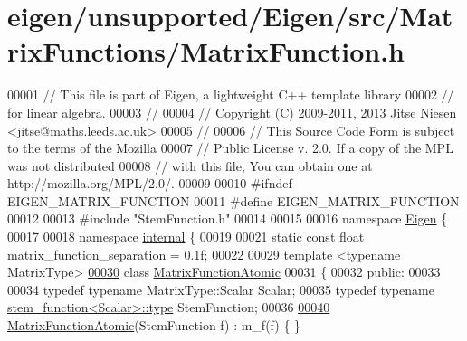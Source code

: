 \hypertarget{eigen_2unsupported_2_eigen_2src_2_matrix_functions_2_matrix_function_8h_source}{}\section{eigen/unsupported/\+Eigen/src/\+Matrix\+Functions/\+Matrix\+Function.h}
\label{eigen_2unsupported_2_eigen_2src_2_matrix_functions_2_matrix_function_8h_source}

\begin{DoxyCode}
00001 \textcolor{comment}{// This file is part of Eigen, a lightweight C++ template library}
00002 \textcolor{comment}{// for linear algebra.}
00003 \textcolor{comment}{//}
00004 \textcolor{comment}{// Copyright (C) 2009-2011, 2013 Jitse Niesen <jitse@maths.leeds.ac.uk>}
00005 \textcolor{comment}{//}
00006 \textcolor{comment}{// This Source Code Form is subject to the terms of the Mozilla}
00007 \textcolor{comment}{// Public License v. 2.0. If a copy of the MPL was not distributed}
00008 \textcolor{comment}{// with this file, You can obtain one at http://mozilla.org/MPL/2.0/.}
00009 
00010 \textcolor{preprocessor}{#ifndef EIGEN\_MATRIX\_FUNCTION}
00011 \textcolor{preprocessor}{#define EIGEN\_MATRIX\_FUNCTION}
00012 
00013 \textcolor{preprocessor}{#include "StemFunction.h"}
00014 
00015 
00016 \textcolor{keyword}{namespace }\hyperlink{namespace_eigen}{Eigen} \{ 
00017 
00018 \textcolor{keyword}{namespace }\hyperlink{namespaceinternal}{internal} \{
00019 
00021 \textcolor{keyword}{static} \textcolor{keyword}{const} \textcolor{keywordtype}{float} matrix\_function\_separation = 0.1f;
00022 
00029 \textcolor{keyword}{template} <\textcolor{keyword}{typename} MatrixType>
\hyperlink{class_eigen_1_1internal_1_1_matrix_function_atomic}{00030} \textcolor{keyword}{class }\hyperlink{class_eigen_1_1internal_1_1_matrix_function_atomic}{MatrixFunctionAtomic} 
00031 \{
00032   \textcolor{keyword}{public}:
00033 
00034     \textcolor{keyword}{typedef} \textcolor{keyword}{typename} MatrixType::Scalar Scalar;
00035     \textcolor{keyword}{typedef} \textcolor{keyword}{typename} \hyperlink{struct_eigen_1_1internal_1_1stem__function}{stem\_function<Scalar>::type} StemFunction;
00036 
\hyperlink{class_eigen_1_1internal_1_1_matrix_function_atomic_a0786bb0349fe5ca5f8df13db7e21e882}{00040}     \hyperlink{class_eigen_1_1internal_1_1_matrix_function_atomic_a0786bb0349fe5ca5f8df13db7e21e882}{MatrixFunctionAtomic}(StemFunction f) : m\_f(f) \{ \}

\end{DoxyCode}
